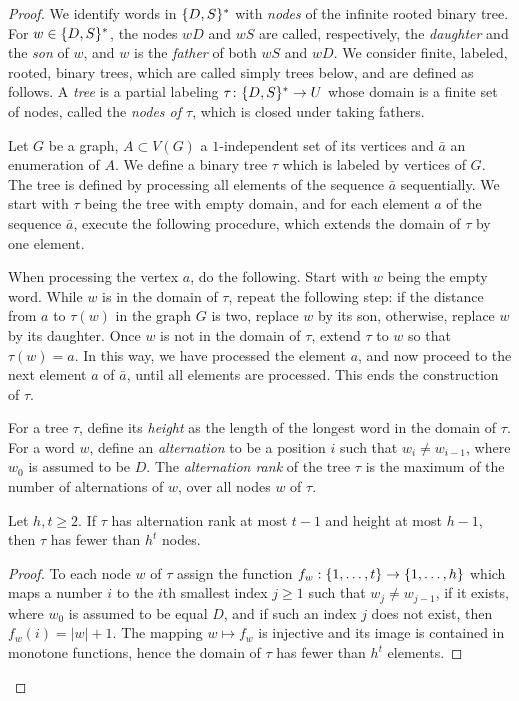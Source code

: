 \begin{proof}
	\newcommand{\dau}{D}
	\newcommand{\son}{S}
	
	We identify words in $\set{\dau,\son}^*$ with \emph{nodes}
	of the infinite rooted binary tree. For $w\in \set{\dau,\son}^*$,
	 the nodes $w\dau$ and $w\son$ are called, respectively, the \emph{daughter} and the \emph{son} of $w$,
	and $w$ is the \emph{father} of both $w\son$ and $w\dau$.
	We consider
	 finite, labeled, rooted, binary trees, which are called simply trees below, and are defined as follows.
	 A \emph{tree} is a partial labeling $\tau\from \set{\dau,\son}^*\to U$ whose domain is a finite set of nodes, called the \emph{nodes of $\tau$}, which is closed under taking fathers.
  
  Let $G$ be a graph, $A\subset V(G)$ a $1$-independent set of its vertices
  and $\bar a$ an enumeration of $A$.
We define  a binary tree $\tau$ which is 
  labeled by vertices of $G$. The tree is defined by processing all elements of the sequence $\bar a$ sequentially. We start with $\tau$ being the  tree with empty domain, and for each element $a$ of the sequence $\bar a$, execute the following procedure, which extends the domain of $\tau$ by one element.
  
When processing the vertex $a$, do the following. Start with $w$ being the empty word. While $w$ is in the domain of $\tau$, repeat the following step: 
  if the distance from $a$ to $\tau(w)$ in the graph 
  $G$ is two, replace $w$ by its son, otherwise, replace $w$ by its daughter.
  Once $w$ is not in the domain of $\tau$, extend $\tau$ to $w$    so that  $\tau(w)=a$. In this way, we have processed the element $a$, and now
    proceed to the next element $a$ of $\bar a$, until all elements are processed. This ends the construction of $\tau$.
	
  
  
  
  \medskip
For a tree $\tau$, define its
\emph{height} as 
the length of the longest word in the domain of $\tau$.
For a word $w$, define an \emph{alternation} to be 
a position $i$ such that $w_i\neq w_{i-1}$, where $w_0$ is assumed to be $\dau$.
 The \emph{alternation rank} of the tree $\tau$ is the maximum of the number of alternations of $w$, over all nodes $w$ of $\tau$.


\begin{lemma}\label{lem:number-of-nodes}
Let $h,t\ge 2$.	If $\tau$ has alternation rank at most $t-1$ and height at most $h-1$, then $\tau$ has fewer than $h^{t}$
	nodes.
\end{lemma}
\begin{proof}		
	To each node $w$ of $\tau$ assign 
	the function $f_w:\{1,\ldots,t\}\to\{1,\ldots,h\}$ which
	maps a number $i$ to the $i$th smallest index $j\ge 1$
	such that $w_j\neq w_{j-1}$, if it exists, 
	where $w_0$ is assumed to be equal $\dau$,
	and if such an index $j$ does not exist, then $f_w(i)=|w|+1$.
		The mapping $w\mapsto f_w$ is injective
and its image is contained in monotone functions, hence the domain of $\tau$ 
		has fewer than $h^{t}$ elements.
\end{proof}


\end{proof}
